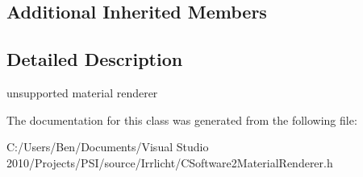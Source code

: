 \subsection*{Additional Inherited Members}


\subsection{Detailed Description}
unsupported material renderer 

The documentation for this class was generated from the following file\-:\begin{DoxyCompactItemize}
\item 
C\-:/\-Users/\-Ben/\-Documents/\-Visual Studio 2010/\-Projects/\-P\-S\-I/source/\-Irrlicht/C\-Software2\-Material\-Renderer.\-h\end{DoxyCompactItemize}
